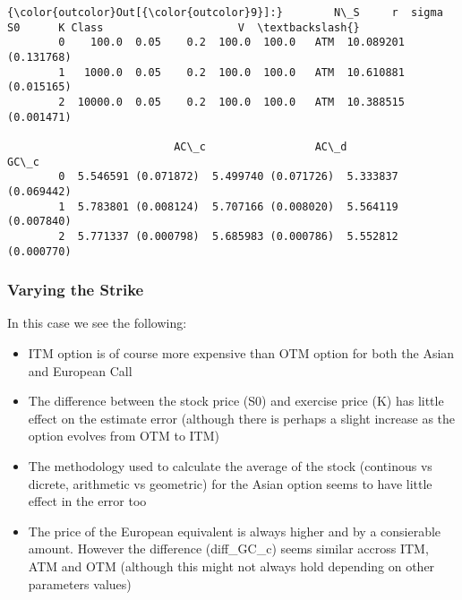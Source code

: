 \documentclass{article}
\providecommand{\tightlist}{%
      \setlength{\itemsep}{0pt}\setlength{\parskip}{0pt}}
\begin{document}
            \begin{Verbatim}[commandchars=\\\{\}]
{\color{outcolor}Out[{\color{outcolor}9}]:}        N\_S     r  sigma     S0      K Class                     V  \textbackslash{}
        0    100.0  0.05    0.2  100.0  100.0   ATM  10.089201 (0.131768)   
        1   1000.0  0.05    0.2  100.0  100.0   ATM  10.610881 (0.015165)   
        2  10000.0  0.05    0.2  100.0  100.0   ATM  10.388515 (0.001471)   
        
                          AC\_c                 AC\_d                 GC\_c  
        0  5.546591 (0.071872)  5.499740 (0.071726)  5.333837 (0.069442)  
        1  5.783801 (0.008124)  5.707166 (0.008020)  5.564119 (0.007840)  
        2  5.771337 (0.000798)  5.685983 (0.000786)  5.552812 (0.000770)  
\end{Verbatim}
        
    \subsubsection{Varying the Strike}\label{varying-the-strike}

In this case we see the following:

\begin{itemize}
\tightlist
\item
  ITM option is of course more expensive than OTM option for both the
  Asian and European Call
\item
  The difference between the stock price (S0) and exercise price (K) has
  little effect on the estimate error (although there is perhaps a
  slight increase as the option evolves from OTM to ITM)
\item
  The methodology used to calculate the average of the stock (continous
  vs dicrete, arithmetic vs geometric) for the Asian option seems to
  have little effect in the error too
\item
  The price of the European equivalent is always higher and by a
  consierable amount. However the difference (diff\_GC\_c) seems similar
  accross ITM, ATM and OTM (although this might not always hold
  depending on other parameters values)
\end{itemize}
\end{document}
